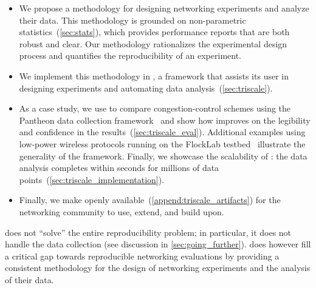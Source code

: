\begin{itemize}
	\item
	We propose a methodology for designing networking experiments and analyze their data.
	This methodology is grounded on non-parametric statistics~(\cref{sec:stats}), which provides performance reports that are both robust and clear.
	Our methodology rationalizes the experimental design process and quantifies the reproducibility of an experiment.

	\item
	We implement this methodology in \triscale, a framework that assists its user in designing experiments and automating data analysis~(\cref{sec:triscale}).

	\item
	As a case study, we use \triscale to compare congestion-control schemes using the Pantheon data collection framework~\cite{yan18pantheon} and show how \triscale improves on the legibility and confidence in the results~(\cref{sec:triscale_eval}).
	Additional examples using low-power wireless protocols running on the FlockLab testbed~\cite{lim2013FlockLab} illustrate the generality of the framework.
	Finally, we showcase the scalability of \triscale: the data analysis completes within seconds for millions of data points~(\cref{sec:triscale_implementation}).

	\item
	Finally, we make \triscale openly available~(\cref{append:triscale_artifacts}) for the networking community to use, extend, and build upon.
\end{itemize}
\triscale does not ``solve'' the entire reproducibility problem; in particular, it does not handle the data collection (see discussion in \cref{sec:going_further}).
\triscale does however fill a critical gap towards reproducible networking evaluations by providing a consistent methodology for the design of networking experiments and the analysis of their data.
